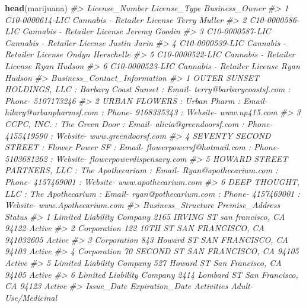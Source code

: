 \documentclass[
  12pt,
]{book}
\newenvironment{Shaded}{\begin{snugshade}}{\end{snugshade}}
\newcommand{\CommentTok}[1]{\textcolor[rgb]{0.37,0.37,0.37}{\textit{#1}}}
\newcommand{\KeywordTok}[1]{\textcolor[rgb]{0.27,0.27,0.27}{\textbf{#1}}}
\newcommand{\NormalTok}[1]{#1}
\begin{document}
\begin{Shaded}
\begin{Highlighting}[]
\KeywordTok{head}\NormalTok{(marijuana)}
\CommentTok{\#>    License\_Number                License\_Type   Business\_Owner}
\CommentTok{\#> 1 C10{-}0000614{-}LIC Cannabis {-} Retailer License     Terry Muller}
\CommentTok{\#> 2 C10{-}0000586{-}LIC Cannabis {-} Retailer License    Jeremy Goodin}
\CommentTok{\#> 3 C10{-}0000587{-}LIC Cannabis {-} Retailer License     Justin Jarin}
\CommentTok{\#> 4 C10{-}0000539{-}LIC Cannabis {-} Retailer License Ondyn Herschelle}
\CommentTok{\#> 5 C10{-}0000522{-}LIC Cannabis {-} Retailer License      Ryan Hudson}
\CommentTok{\#> 6 C10{-}0000523{-}LIC Cannabis {-} Retailer License      Ryan Hudson}
\CommentTok{\#>                                                                                                           Business\_Contact\_Information}
\CommentTok{\#> 1                             OUTER SUNSET HOLDINGS, LLC  : Barbary Coast Sunset : Email{-} terry@barbarycoastsf.com : Phone{-} 5107173246}
\CommentTok{\#> 2                           URBAN FLOWERS  : Urban Pharm : Email{-} hilary@urbanpharmsf.com : Phone{-} 9168335343 : Website{-} www.up415.com}
\CommentTok{\#> 3                      CCPC, INC.  : The Green Door : Email{-} alicia@greendoorsf.com : Phone{-} 4155419590 : Website{-} www.greendoorsf.com}
\CommentTok{\#> 4 SEVENTY SECOND STREET  : Flower Power SF : Email{-} flowerpowersf@hotmail.com : Phone{-} 5103681262 : Website{-} flowerpowerdispensary.com}
\CommentTok{\#> 5   HOWARD STREET PARTNERS, LLC  : The Apothecarium : Email{-} Ryan@apothecarium.com : Phone{-} 4157469001 : Website{-} www.apothecarium.com}
\CommentTok{\#> 6              DEEP THOUGHT, LLC  : The Apothecarium : Email{-} ryan@pothecarium.com : Phone{-} 4157469001 : Website{-} www.Apothecarium.com}
\CommentTok{\#>          Business\_Structure                         Premise\_Address Status}
\CommentTok{\#> 1 Limited Liability Company  2165 IRVING ST san francisco, CA 94122 Active}
\CommentTok{\#> 2               Corporation 122 10TH ST SAN FRANCISCO, CA 941032605 Active}
\CommentTok{\#> 3               Corporation   843 Howard ST SAN FRANCISCO, CA 94103 Active}
\CommentTok{\#> 4               Corporation    70 SECOND ST SAN FRANCISCO, CA 94105 Active}
\CommentTok{\#> 5 Limited Liability Company   527 Howard ST San Francisco, CA 94105 Active}
\CommentTok{\#> 6 Limited Liability Company 2414 Lombard ST San Francisco, CA 94123 Active}
\CommentTok{\#>   Issue\_Date Expiration\_Date                Activities Adult{-}Use/Medicinal}

\end{Highlighting}
\end{Shaded}
\end{document}
